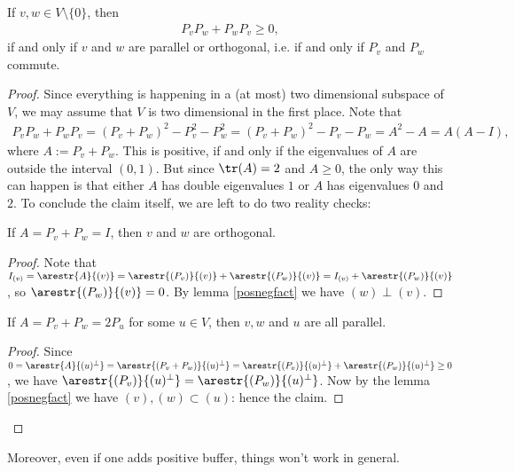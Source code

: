 \begin{prop}\label{symmetric_projection}
	If $v, w \in V \setminus \{0\}$, then
	\begin{align*}
		P_{v} P_{w} + P_{w} P_{v} \geq 0,
	\end{align*}
	if and only if $v$ and $w$ are parallel or orthogonal, i.e. if and only if $P_{v}$ and $P_{w}$ commute.
\end{prop}
\begin{proof}
	Since everything is happening in a (at most) two dimensional subspace of $V$, we may assume that $V$ is two dimensional in the first place. Note that
	\begin{align*}
		P_{v} P_{w} + P_{w} P_{v} = (P_{v} + P_{w})^2 - P_{v}^2 - P_{w}^2 = (P_{v} + P_{w})^2 - P_{v} - P_{w} = A^2 - A = A (A - I),
	\end{align*}
	where $A := P_{v} + P_{w}$. This is positive, if and only if the eigenvalues of $A$ are outside the interval $(0, 1)$. But since $\tr(A) = 2$ and $A \geq 0$, the only way this can happen is that either $A$ has double eigenvalues $1$ or $A$ has eigenvalues $0$ and $2$. To conclude the claim itself, we are left to do two reality checks:
	\begin{lem}
		If $A = P_{v} + P_{w} = I$, then $v$ and $w$ are orthogonal.
	\end{lem}
	\begin{proof}
		Note that $I_{(v)} = \arestr{A}{(v)} = \arestr{(P_{v})}{(v)} + \arestr{(P_{w})}{(v)} = I_{(v)} + \arestr{(P_{w})}{(v)}$, so $\arestr{(P_{w})}{(v)} = 0$. By lemma \ref{posnegfact} we have $(w) \perp (v)$.
	\end{proof}
	\begin{lem}
		If $A = P_{v} + P_{w} = 2 P_{u}$ for some $u \in V$, then $v, w$ and $u$ are all parallel.
	\end{lem}
	\begin{proof}
		Since $0 = \arestr{A}{(u)^{\perp}} = \arestr{(P_{v} + P_{w})}{(u)^{\perp}} = \arestr{(P_{v})}{(u)^{\perp}} + \arestr{(P_{w})}{(u)^{\perp}} \geq 0$, we have $\arestr{(P_{v})}{(u)^{\perp}} =  \arestr{(P_{w})}{(u)^{\perp}}$. Now by the lemma \ref{posnegfact} we have $(v), (w) \subset (u)$: hence the claim.
	\end{proof}
\end{proof}


Moreover, even if one adds positive buffer, things won't work in general.

